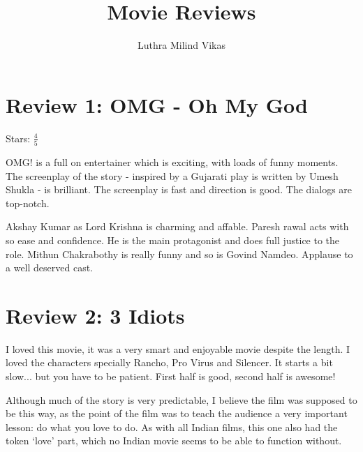 \documentclass{article}
\author{Luthra Milind Vikas}
\date{}
\title{Movie Reviews}
\begin{document}
\maketitle

\section{Review 1: OMG - Oh My God}

Stars: $\frac{4}{5}$



OMG! is a full on entertainer which is exciting, with loads of funny moments. The screenplay of the story - inspired by a Gujarati play is written by Umesh Shukla - is brilliant. The screenplay is fast and direction is good. The dialogs are top-notch.

Akshay Kumar as Lord Krishna is charming and affable. Paresh rawal acts with so ease and confidence. He is the main protagonist and does full justice to the role. Mithun Chakrabothy is really funny and so is Govind Namdeo. Applause to a well deserved cast.


\section{Review 2: 3 Idiots}

I loved this movie, it was a very smart and enjoyable movie despite the length. I loved the characters specially Rancho, Pro Virus and Silencer. It starts a bit slow... but you have to be patient. First half is good, second half is awesome!

Although much of the story is very predictable, I believe the film was supposed to be this way, as the point of the film was to teach the audience a very important lesson: do what you love to do. As with all Indian films, this one also had the token `love' part, which no Indian movie seems to be able to function without.


\end{document}

